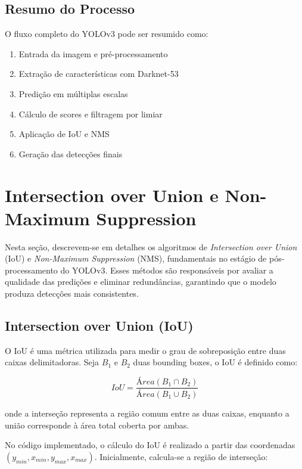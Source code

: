 \documentclass[conference]{IEEEtran}
\begin{document}
\subsection{Resumo do Processo}

O fluxo completo do YOLOv3 pode ser resumido como:

\begin{enumerate}
    \item Entrada da imagem e pré-processamento
    \item Extração de características com Darknet-53
    \item Predição em múltiplas escalas
    \item Cálculo de scores e filtragem por limiar
    \item Aplicação de IoU e NMS
    \item Geração das detecções finais
\end{enumerate}

\section{Intersection over Union e Non-Maximum Suppression}

Nesta seção, descrevem-se em detalhes os algoritmos de \textit{Intersection over Union} (IoU) e \textit{Non-Maximum Suppression} (NMS), fundamentais no estágio de pós-processamento do YOLOv3. Esses métodos são responsáveis por avaliar a qualidade das predições e eliminar redundâncias, garantindo que o modelo produza detecções mais consistentes.

\subsection{Intersection over Union (IoU)}

O IoU é uma métrica utilizada para medir o grau de sobreposição entre duas caixas delimitadoras. Seja $B_1$ e $B_2$ duas bounding boxes, o IoU é definido como:

\begin{equation}
IoU = \frac{Área(B_1 \cap B_2)}{Área(B_1 \cup B_2)}
\end{equation}

onde a interseção representa a região comum entre as duas caixas, enquanto a união corresponde à área total coberta por ambas.

No código implementado, o cálculo do IoU é realizado a partir das coordenadas $(y_{min}, x_{min}, y_{max}, x_{max})$. Inicialmente, calcula-se a região de interseção:
\end{document}
